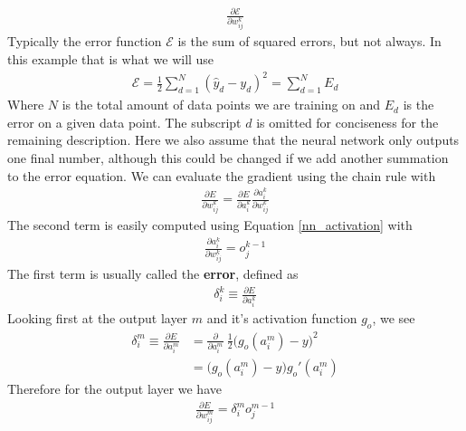 \begin{align}
	\frac{\partial \mathcal{E}}{\partial w_{ij}^k} 
\end{align}
Typically the error function $\mathcal{E}$ is the sum of squared errors, but not always. In this example that is what we will use
\begin{align}
	\mathcal{E} = \frac{1}{2}\sum_{d=1}^N (\hat{y}_d-y_d)^2 = \sum_{d=1}^N E_d
\end{align}
Where $N$ is the total amount of data points we are training on and $E_{d}$ is the error on a given data point. The subscript $d$ is omitted for conciseness for the remaining description. Here we also assume that the neural network only outputs one final number, although this could be changed if we add another summation to the error equation. We can evaluate the gradient using the chain rule with
\begin{align}\label{neural_net_error}
	\frac{\partial E}{\partial w_{ij}^k} = \frac{\partial E}{\partial a_{i}^k}\frac{\partial a_{i}^k}{\partial w_{ij}^k}
\end{align}
The second term is easily computed using Equation \ref{nn_activation} with
\begin{align}
	\frac{\partial a_{i}^k}{\partial w_{ij}^k} = o_j^{k-1}
\end{align}
The first term is usually called the \textbf{error}, defined as 
\begin{align}
	\delta_{i}^k \equiv \frac{\partial E}{\partial a_{i}^k}
\end{align}
Looking first at the output layer $m$ and it's activation function $g_o$, we see
\begin{align}
	\delta_{i}^m \equiv \frac{\partial E}{\partial a_{i}^m} &= \frac{\partial}{\partial{a_{i}^m}}~\frac{1}{2} \Big(g_o(a_{i}^m)-y\Big)^2\\
	&= \Big(g_o(a_{i}^m)-y\Big)g_o'(a_{i}^m)
\end{align}
Therefore for the output layer we have
\begin{align}
	\frac{\partial E}{\partial w_{ij}^m} = \delta_{i}^m o_j^{m-1}
\end{align}



